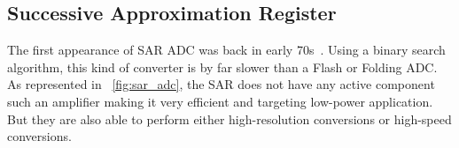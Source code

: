 

\newpage
\subsection{Successive Approximation Register} %
\label{sec:sar-adc}
The first appearance of SAR ADC was back in early 70s~\cite{McCreary1975}. Using a binary search algorithm, this kind of converter is by far slower than a Flash or Folding ADC\@. As represented in \figurename~\ref{fig:sar_adc}, the SAR does not have any active component such an amplifier making it very efficient and targeting low-power application. But they are also able to perform either high-resolution conversions or high-speed conversions.

